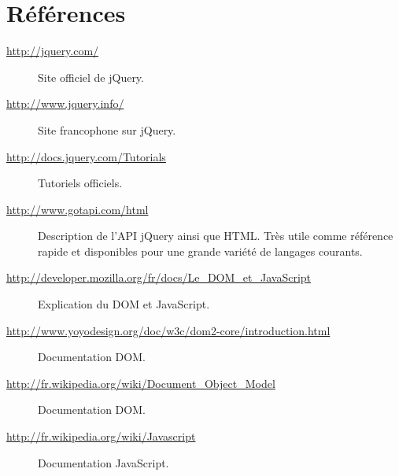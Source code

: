 \documentclass[10pt,a4paper,titlepage]{article}
\begin{document}
\section{Références}
\small
\begin{description}
	\item[\url{http://jquery.com/}] {Site officiel de jQuery.}
	\item[\url{http://www.jquery.info/}] {Site francophone sur jQuery.}
	\item[\url{http://docs.jquery.com/Tutorials}] {Tutoriels officiels.}
	\item[\url{http://www.gotapi.com/html}] {Description de l'API jQuery ainsi que HTML. Très utile comme référence rapide et disponibles pour une grande variété de langages courants.}
	\item[\url{http://developer.mozilla.org/fr/docs/Le_DOM_et_JavaScript}] {Explication du DOM et JavaScript.}
	\item[\url{http://www.yoyodesign.org/doc/w3c/dom2-core/introduction.html}] {Documentation DOM.}
	\item[\url{http://fr.wikipedia.org/wiki/Document_Object_Model}] {Documentation DOM.}
	\item[\url{http://fr.wikipedia.org/wiki/Javascript}] {Documentation JavaScript.}
\end{description}
\end{document}
